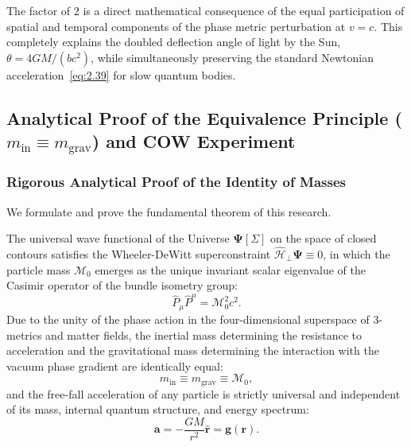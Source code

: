 The factor of 2 is a direct mathematical consequence of the equal participation of spatial and temporal components of the phase metric perturbation at $v = c$. This completely explains the doubled deflection angle of light by the Sun, $\theta = 4GM/(bc^2)$, while simultaneously preserving the standard Newtonian acceleration~\eqref{eq:2.39} for slow quantum bodies.

\subsection{Analytical Proof of the Equivalence Principle ($m_{\text{in}} \equiv m_{\text{grav}}$) and COW Experiment}\label{sec:2.5}

\subsubsection{Rigorous Analytical Proof of the Identity of Masses}\label{sec:2.5.1}

We formulate and prove the fundamental theorem of this research.

\begin{theorem}\label{thm:wep}
The universal wave functional of the Universe $\mathbf{\Psi}[\Sigma]$ on the space of closed contours satisfies the Wheeler-DeWitt superconstraint $\hat{\mathcal{H}}_\perp \mathbf{\Psi} \equiv 0$, in which the particle mass $\mathcal{M}_0$ emerges as the unique invariant scalar eigenvalue of the Casimir operator of the bundle isometry group:
\begin{equation*}
\hat{P}_\mu \hat{P}^\mu = \mathcal{M}_0^2 c^2.
\end{equation*}
Due to the unity of the phase action in the four-dimensional superspace of 3-metrics and matter fields, the inertial mass determining the resistance to acceleration and the gravitational mass determining the interaction with the vacuum phase gradient are identically equal:
\begin{equation}\label{eq:2.42}\label{eq:2.92}\tag{2.42}
m_{\text{in}} \equiv m_{\text{grav}} \equiv \mathcal{M}_0,
\end{equation}
and the free-fall acceleration of any particle is strictly universal and independent of its mass, internal quantum structure, and energy spectrum:
\begin{equation}\label{eq:2.43}\label{eq:2.93}\tag{2.43}
\mathbf{a} = -\frac{GM}{r^2} \hat{\mathbf{r}} = \mathbf{g}(\mathbf{r}).
\end{equation}
\end{theorem}

